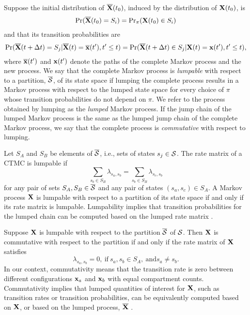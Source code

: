 Suppose the initial distribution of $ \overline{\mathbf{X}}(t_0) $, induced by the distribution of $ \mathbf{X}(t_0) $, is \begin{equation*}
\Pr(\overline{\mathbf{X}}(t_0) = S_i) = \mathrm{Pr}_\pi(\mathbf{X}(t_0) \in S_i)
\end{equation*}
and that its transition probabilities are
\begin{equation*}
\Pr(\overline{\mathbf{X}}(t+\Delta t) = S_j | \overline{\mathbf{X}}(t)=\overline{\mathbf{x}}(t^\prime), t^\prime \leq t) = \Pr(\overline{\mathbf{X}}(t+\Delta t) \in S_j | \mathbf{X}(t)=\mathbf{x}(t^\prime), t^\prime \leq t),
\end{equation*}
where $ \overline{\mathbf{x}}(t^\prime) $  and $ \mathbf{x}(t^\prime) $ denote the paths of the complete Markov process and the new process. We say that the complete Markov process is \textit{lumpable} with respect to a partition, $ \overline{\mathcal{S}} $, of its state space if lumping the complete process results in a Markov process with respect to the lumped state space for every choice of $ \pi $ whose transition probabilities do not depend on $ \pi $. We refer to the process obtained by lumping as the \textit{lumped} Markov process. If the jump chain of the lumped Markov process is the same as the lumped jump chain of the complete Markov process, we say that the complete process is \textit{commutative} with respect to lumping.  

Let $ S_A $ and $ S_B $ be elements of $ \overline{\mathcal{S}} $, i.e., sets of states $ s_j \in \mathcal{S} $. The rate matrix of a CTMC is lumpable if
\begin{equation*}
\sum_{s_b \in S_B}\lambda_{s_a,s_b} = \sum_{s_b \in S_B}\lambda_{s_c,s_b}
\end{equation*}
for any pair of sets $S_A,S_B \in \overline{\mathcal{S}} $ and any pair of states  $(s_a, s_c) \in S_A$. A Markov process $ \mathbf{X} $ is lumpable with respect to a partition of its state space if and only if its rate matrix is lumpable. Lumpability implies that transition probabilities for the lumped chain can be computed based on the lumped rate matrix  \cite{tian2006lumpability}.

Suppose $ \mathbf{X} $ is lumpable with respect to the partition $ \overline{\mathcal{S}} $ of $ \mathcal{S} $. Then $ \mathbf{X} $ is commutative with respect to the partition if and only if the rate matrix of $ \mathbf{X} $ satisfies
$$\lambda_{s_a,s_b} = 0,\ \text{if}\ s_a,s_b\in S_A,\ \text{and} s_a\neq s_b. $$ In our context, commutativity means that the transition rate is zero between different configurations $ \mathbf{x}_a $ and $ \mathbf{x}_b $ with equal compartment counts. Commutativity implies that lumped quantities of interest for $ \mathbf{X} $, such as transition rates or transition probabilities, can be equivalently computed based on $ \mathbf{X} $, or based on the lumped process, $ \overline{\mathbf{X}} $ \cite{tian2006lumpability}. 


